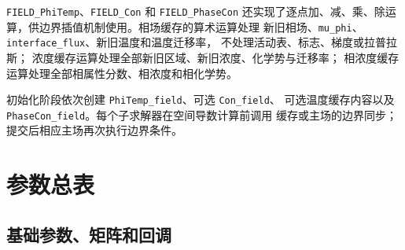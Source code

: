 \documentclass[UTF8,a4paper,11pt]{ctexart}
\newcommand{\code}[1]{\texttt{#1}}
\begin{document}
\code{FIELD\_PhiTemp}、\code{FIELD\_Con} 和 \code{FIELD\_PhaseCon}
还实现了逐点加、减、乘、除运算，供边界插值机制使用。相场缓存的算术运算处理
新旧相场、\code{mu\_phi}、\code{interface\_flux}、新旧温度和温度迁移率，
不处理活动表、标志、梯度或拉普拉斯；
浓度缓存运算处理全部新旧区域、新旧浓度、化学势与迁移率；
相浓度缓存运算处理全部相属性分数、相浓度和相化学势。

初始化阶段依次创建 \code{PhiTemp\_field}、可选 \code{Con\_field}、
可选温度缓存内容以及 \code{PhaseCon\_field}。每个子求解器在空间导数计算前调用
缓存或主场的边界同步；提交后相应主场再次执行边界条件。

\section{参数总表}

\subsection{基础参数、矩阵和回调}
\end{document}
